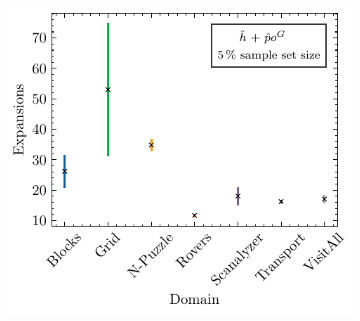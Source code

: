 \documentclass[ppgc,diss,english]{iiufrgs}
\begin{document}
\begin{figure}[tb]
\begin{subfigure}{0.41\textwidth}
    \includegraphics[width=\linewidth]{img/error_hNN_poG_5pct.pdf}
  \end{subfigure}


  \vspace{0.5cm}


\end{figure}
\end{document}
